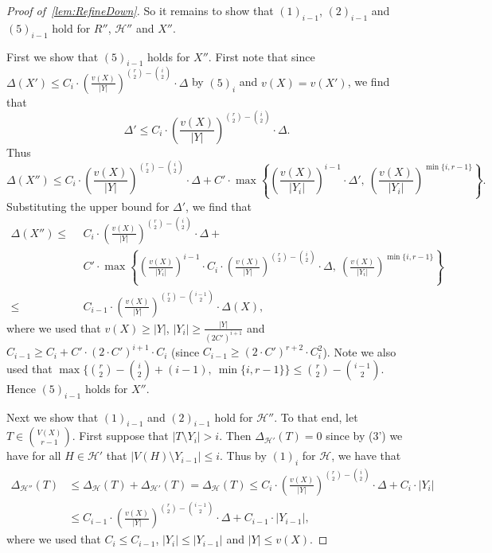 \documentclass[11pt]{article}
\newcounter{i}
\theoremstyle{plain}
\renewcommand{\theclaim}{\thetheorem.\arabic{claim}}
\newenvironment{lateproof}[1]
 {%
  \renewcommand{\theclaim}{\ref{#1}.\arabic{claim}}%
  \begin{proof}[Proof of~\cref{#1}]%
 }
 {\end{proof}}
\theoremstyle{plain} %
\theoremstyle{definition}
\begin{document}
\begin{lateproof}{lem:RefineDown}
So it remains to show that $(1)_{i-1}$, $(2)_{i-1}$ and $(5)_{i-1}$ hold for $R''$, $\mathcal{H}''$ and $X''$. 

First we show that $(5)_{i-1}$ holds for $X''$. First note that since $\Delta(X')\le C_i\cdot \left(\frac{v(X)}{|Y|}\right)^{\binom{r}{2}-\binom{i}{2}} \cdot \Delta$ by $(5)_i$ and $v(X)=v(X')$, we find that 
$$\Delta' \le C_i\cdot \left(\frac{v(X)}{|Y|}\right)^{\binom{r}{2}-\binom{i}{2}} \cdot \Delta.$$
Thus
$$\Delta(X'')\le C_i \cdot \left(\frac{v(X)}{|Y|}\right)^{\binom{r}{2}-\binom{i}{2}} \cdot \Delta+ C' \cdot \max\left\{\left(\frac{v(X)}{|Y_i|}\right)^{i-1} \cdot \Delta',~\left(\frac{v(X)}{|Y_i|}\right)^{\min\{i,r-1\}}\right\}.$$
Substituting the upper bound for $\Delta'$, we find that
\begin{align*}
\Delta(X'') \le~~&C_i \cdot \left(\frac{v(X)}{|Y|}\right)^{\binom{r}{2}-\binom{i}{2}} \cdot \Delta+\\
&C' \cdot \max\left\{\left(\frac{v(X)}{|Y_i|}\right)^{i-1} \cdot C_i \cdot \left(\frac{v(X)}{|Y|}\right)^{\binom{r}{2}-\binom{i}{2}} \cdot \Delta,~\left(\frac{v(X)}{|Y_i|}\right)^{\min\{i,r-1\}}\right\} \\
\le~~&C_{i-1} \cdot \left(\frac{v(X)}{|Y|}\right)^{\binom{r}{2}-\binom{i-1}{2}} \cdot \Delta(X),
\end{align*}
where we used that $v(X)\ge |Y|$, $|Y_i|\ge \frac{|Y|}{(2C')^{i+1}}$ and $C_{i-1} \ge C_i + C' \cdot (2\cdot C')^{i+1}\cdot C_i$ (since $C_{i-1} \ge (2\cdot C')^{r+2} \cdot C_i^2$). Note we also used that $\max\{\binom{r}{2}-\binom{i}{2}+(i-1),~\min\{i,r-1\}\} \le \binom{r}{2}-\binom{i-1}{2}$. Hence $(5)_{i-1}$ holds for $X''$.

Next we show that $(1)_{i-1}$ and $(2)_{i-1}$ hold for $\mathcal{H}''$. To that end, let $T\in \binom{V(X)}{r-1}$. First suppose that $|T\setminus Y_i| > i$. Then $\Delta_{\mathcal{H'}}(T)=0$ since by (3') we have for all $H\in\mathcal{H}'$ that $|V(H)\setminus Y_{i-1}| \le i$. Thus by $(1)_i$ for $\mathcal{H}$, we have that
\begin{align*}\Delta_{\mathcal{H}''}(T) &\le \Delta_{\mathcal{H}}(T) + \Delta_{\mathcal{H'}}(T) = \Delta_{\mathcal{H}}(T) \le  C_i \cdot \left(\frac{v(X)}{|Y|}\right)^{\binom{r}{2}-\binom{i}{2}} \cdot \Delta+ C_i \cdot |Y_i|\\
&\le C_{i-1} \cdot \left(\frac{v(X)}{|Y|}\right)^{\binom{r}{2}-\binom{i-1}{2}} \cdot \Delta+ C_{i-1} \cdot |Y_{i-1}|,
\end{align*}
where we used that $C_i\le C_{i-1}$, $|Y_i|\le |Y_{i-1}|$ and $|Y|\le v(X)$.


\end{lateproof}
\end{document}
